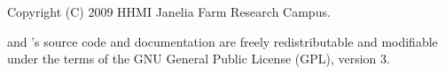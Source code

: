 \vspace*{\fill}
\begin{flushleft}
Copyright (C) 2009 HHMI Janelia Farm Research Campus.

\vspace{2em} 

 and 's source code and documentation are freely
redistributable and modifiable under the terms of the GNU General
Public License (GPL), version 3.
\end{flushleft}
